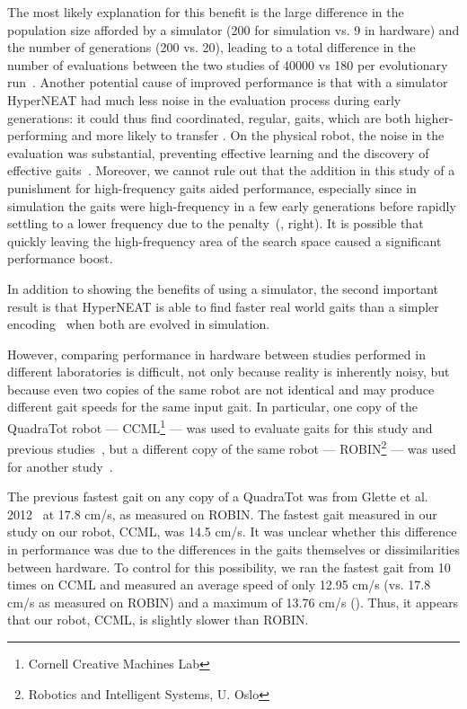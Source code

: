 The most likely explanation for this benefit is the large difference
in the population size afforded by a simulator (200 for simulation
vs. 9 in hardware) and the number of generations (200 vs. 20), leading
to a total difference in the number of evaluations between the two
studies of 40000 vs 180 per evolutionary run~\cite{yos:clune}. Another
potential cause of improved performance is that with a simulator
HyperNEAT had much less noise in the evaluation process during early
generations: it could thus find coordinated, regular, gaits, which are
both higher-performing and more likely to transfer . On the physical robot, the noise in the evaluation was
substantial, preventing effective learning and the discovery of
effective gaits~\cite{yos:clune}. Moreover, we cannot rule out that
the addition in this study of a punishment for high-frequency gaits
aided performance, especially since in simulation the gaits were
high-frequency in a few early generations before rapidly settling to a
lower frequency due to the penalty~(,
right). It is possible that quickly leaving the high-frequency area of
the search space caused a significant performance boost.

In addition to showing the benefits of using a simulator, the second
important result is that HyperNEAT is able to find faster real world gaits
than a simpler encoding~\cite{glette} when both are evolved in simulation.

However, comparing performance in hardware between studies performed in
different laboratories is difficult, not only because reality is
inherently noisy, but because even two copies of the same robot are
not identical and may produce different gait speeds for the same input
gait. In particular, one copy of the QuadraTot robot ---
CCML\footnote{Cornell Creative Machines Lab} --- was used to evaluate
gaits for this study and previous studies~\cite{yos:clune,haocheng},
but a different copy of the same robot --- ROBIN\footnote{Robotics and
Intelligent Systems, U. Oslo} --- was used for another
study~\cite{glette}.

The previous fastest gait on any copy of a QuadraTot was from Glette
et al. 2012~\cite{glette} at 17.8 cm/s, as measured on ROBIN. The
fastest gait measured in our study on our robot, CCML, was 14.5
cm/s. It was unclear whether this difference in performance was due to
the differences in the gaits themselves or dissimilarities between
hardware. To control for this possibility, we ran the fastest gait
from \cite{glette} 10 times on CCML and measured an average speed of
only 12.95 cm/s (vs. 17.8 cm/s as measured on ROBIN) and a maximum of
13.76 cm/s (). Thus, it appears that our robot,
CCML, is slightly slower than ROBIN.

